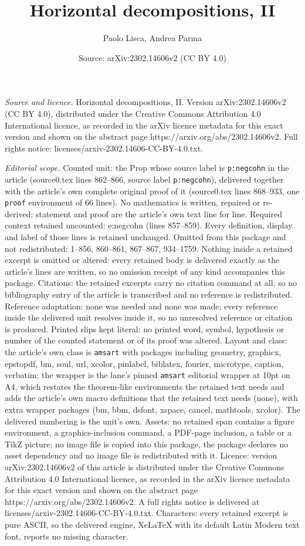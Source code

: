 \documentclass[10pt,a4paper]{amsart}
\title[Horizontal decompositions, II]{Horizontal decompositions, II}
\author{Paolo Lisca, Andrea Parma}
\date{Source: arXiv:2302.14606v2 (CC BY 4.0)}
\begin{document}
\maketitle

\noindent\emph{Source and licence.} Horizontal decompositions, II. Version arXiv:2302.14606v2 (CC BY 4.0), distributed under the Creative Commons Attribution 4.0 International licence, as recorded in the arXiv licence metadata for this exact version and shown on the abstract page https://arxiv.org/abs/2302.14606v2. Full rights notice: licenses/arxiv-2302.14606-CC-BY-4.0.txt.\par\smallskip

\noindent\textit{Editorial scope.} Counted unit: the Prop whose source label is \texttt{p:negcohn} in the article (source0.tex lines 862--866, source label \texttt{p:negcohn}), delivered together with the article's own complete original proof of it (source0.tex lines 868--933, one \texttt{proof} environment of 66 lines). No mathematics is written, repaired or re-derived: statement and proof are the article's own text line for line. Required context retained uncounted: e:negcohn (lines 857--859). Every definition, display and label of those lines is retained unchanged. Omitted from this package and not redistributed: 1--856, 860--861, 867--867, 934--1759. Nothing inside a retained excerpt is omitted or altered: every retained body is delivered exactly as the article's lines are written, so no omission receipt of any kind accompanies this package. Citations: the retained excerpts carry no citation command at all, so no bibliography entry of the article is transcribed and no reference is redistributed. Reference adaptation: none was needed and none was made; every reference inside the delivered unit resolves inside it, so no unresolved reference or citation is produced. Printed slips kept literal: no printed word, symbol, hypothesis or number of the counted statement or of its proof was altered. Layout and class: the article's own class is \texttt{amsart} with packages including geometry, graphicx, epstopdf, bm, soul, url, xcolor, pinlabel, biblatex, fourier, microtype, caption, verbatim; the wrapper is the lane's pinned \texttt{amsart} editorial wrapper at 10pt on A4, which restates the theorem-like environments the retained text needs and adds the article's own macro definitions that the retained text needs (none), with extra wrapper packages (bm, bbm, dsfont, xspace, cancel, mathtools, xcolor). The delivered numbering is the unit's own. Assets: no retained span contains a figure environment, a graphics-inclusion command, a PDF-page inclusion, a table or a TikZ picture; no image file is copied into this package, the package declares no asset dependency and no image file is redistributed with it. Licence: version arXiv:2302.14606v2 of this article is distributed under the Creative Commons Attribution 4.0 International licence, as recorded in the arXiv licence metadata for this exact version and shown on the abstract page https://arxiv.org/abs/2302.14606v2. A full rights notice is delivered at licenses/arxiv-2302.14606-CC-BY-4.0.txt. Characters: every retained excerpt is pure ASCII, so the delivered engine, XeLaTeX with its default Latin Modern text font, reports no missing character.
\end{document}
